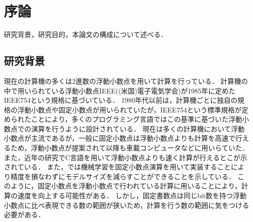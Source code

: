 \chapter{序論}
\label{chap:序論}
研究背景，研究目的，本論文の構成について述べる．
\begin{comment}
    目標規定：
    この修士論文は，固定小数点演算が浮動小数点演算に比べ精度の高い計算を行える場合があることを示すために書く．
\end{comment}
\section{研究背景}
\begin{comment}
    研究テーマにおける既存の知見は何か？
    分かっていないこと、究明すべきことは何か？
    その不足点を究明する意義は何か？
    自分の研究の論拠や仮説は何か？
    
    ストーリー：
    固定小数点演算は浮動小数点演算よりも計算時間が速いとされている．
    しかし，浮動小数点に比べて精度が低くなる恐れがある．
    本論文では，固定小数点と浮動小数点での数値計算の結果を比べ，固定小数点での演算も浮動小数点と同程度の精度で計算できることを示した．
    実験結果より固定小数点演算で浮動小数点より高速で，浮動小数点と同程度の計算を実現できるのではないかと考える．
\end{comment}
現在の計算機の多くは2進数の浮動小数点を用いて計算を行っている．
計算機の中で用いられている浮動小数点IEEE((米国)電子電気学会)が1985年に定めたIEEE754という規格に基づいている．
1980年代以前は，計算機ごとに独自の規格の浮動小数点や固定小数点が用いられていたが，IEEE754という標準規格が定められたことにより，多くのプログラミング言語ではこの基準に基づいた浮動小数点での演算を行うように設計されている．
現在は多くの計算機において浮動小数点が主流であるが，一般に固定小数点は浮動小数点よりも計算を高速で行えるため，浮動小数点が提案されて以降も車載コンピュータなどに用いらていた．
また，近年の研究でC言語を用いて浮動小数点よりも速く計算が行えるとこが示されている\cite{IJERTV12IS010134}．
また，\cite{pmlr-v48-linb16}では機械学習を固定小数点演算を用いて実装することにより精度を損なわずにモデルサイズを減らすことができることを示している．
このように，固定小数点を浮動小数点で行われている計算に用いることにより，計算の速度を向上する可能性がある．
しかし，固定書数点は同じbit数を持つ浮動小数点に比べ表現できる数の範囲が狭いため，計算を行う数の範囲に気をつける必要がある．


